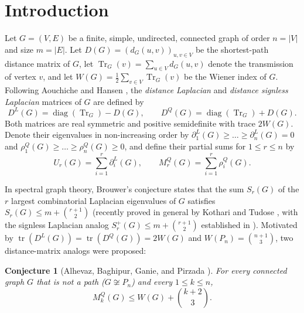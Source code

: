 \documentclass[11pt,a4paper]{article}
\newtheorem{conjecture}[theorem]{Conjecture}
\theoremstyle{remark}
\DeclareMathOperator{\Tr}{Tr}
\DeclareMathOperator{\diag}{diag}
\begin{document}
\begin{abstract}
\medskip
\noindent\textbf{Keywords:} Distance Laplacian matrix; Distance signless Laplacian matrix; Brouwer's conjecture; Wiener index; Schur majorization; Ky Fan inequality; Lean~4 formal verification.

\noindent\textbf{2020 Mathematics Subject Classification:} Primary 05C50; Secondary 05C12, 15A18, 15A42.
\end{abstract}

\section{Introduction}
Let $G = (V, E)$ be a finite, simple, undirected, connected graph of order $n = |V|$ and size $m = |E|$. Let $D(G) = (d_G(u,v))_{u,v \in V}$ be the shortest-path distance matrix of $G$, let $\Tr_G(v) = \sum_{u \in V} d_G(u,v)$ denote the transmission of vertex $v$, and let $W(G) = \frac{1}{2}\sum_{v \in V} \Tr_G(v)$ be the Wiener index of $G$. Following Aouchiche and Hansen \cite{AH2013}, the \emph{distance Laplacian} and \emph{distance signless Laplacian} matrices of $G$ are defined by
\[
D^L(G) = \diag(\Tr_G) - D(G), \qquad D^Q(G) = \diag(\Tr_G) + D(G).
\]
Both matrices are real symmetric and positive semidefinite with trace $2W(G)$. Denote their eigenvalues in non-increasing order by $\partial_1^L(G) \ge \dots \ge \partial_n^L(G) = 0$ and $\rho_1^Q(G) \ge \dots \ge \rho_n^Q(G) \ge 0$, and define their partial sums for $1 \le r \le n$ by
\[
U_r(G) = \sum_{i=1}^{r} \partial_i^L(G), \qquad M_r^Q(G) = \sum_{i=1}^{r} \rho_i^Q(G).
\]

In spectral graph theory, Brouwer's conjecture \cite{BH2012} states that the sum $S_r(G)$ of the $r$ largest combinatorial Laplacian eigenvalues of $G$ satisfies $S_r(G) \le m + \binom{r+1}{2}$ (recently proved in general by Kothari and Tudose \cite{KT2026}, with the signless Laplacian analog $S_r^+(G) \le m + \binom{r+1}{2}$ established in \cite{SignlessBrouwer2026}). Motivated by $\operatorname{tr}(D^L(G)) = \operatorname{tr}(D^Q(G)) = 2W(G)$ and $W(P_n) = \binom{n+1}{3}$, two distance-matrix analogs were proposed:

\begin{conjecture}[Alhevaz, Baghipur, Ganie, and Pirzada \cite{ABGP2021}]\label{conj:DQ}
For every connected graph $G$ that is not a path ($G \not\cong P_n$) and every $1 \le k \le n$,
\begin{equation}\label{eq:DQ-conj}
M_k^Q(G) \le W(G) + \binom{k+2}{3}.
\end{equation}
\end{conjecture}
\end{document}
